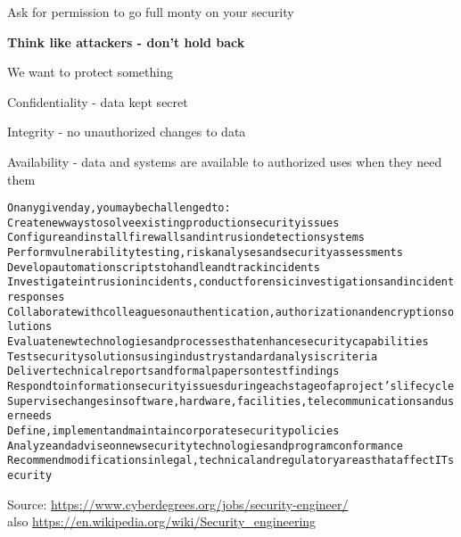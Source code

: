 \documentclass[Screen16to9,17pt]{foils}
\begin{document}
Ask for permission to go full monty on your security

{\bf Think like attackers - don't hold back}




\begin{list1}
\item We want to protect something
\item Confidentiality - data kept secret
\item Integrity - no unauthorized changes to data
\item Availability - data and systems are available to authorized uses when they need them
\end{list1}


\begin{alltt}\small
On any given day, you may be challenged to:
        Create new ways to solve existing production security issues
        Configure and install firewalls and intrusion detection systems
        Perform vulnerability testing, risk analyses and security assessments
        Develop automation scripts to handle and track incidents
        Investigate intrusion incidents, conduct forensic investigations and incident responses
        Collaborate with colleagues on authentication, authorization and encryption solutions
        Evaluate new technologies and processes that enhance security capabilities
        Test security solutions using industry standard analysis criteria
        Deliver technical reports and formal papers on test findings
        Respond to information security issues during each stage of a project’s lifecycle
        Supervise changes in software, hardware, facilities, telecommunications and user needs
        Define, implement and maintain corporate security policies
        Analyze and advise on new security technologies and program conformance
        Recommend modifications in legal, technical and regulatory areas that affect IT security
\end{alltt}

Source: \url{https://www.cyberdegrees.org/jobs/security-engineer/}\\
also
\url{https://en.wikipedia.org/wiki/Security_engineering}



\end{document}
